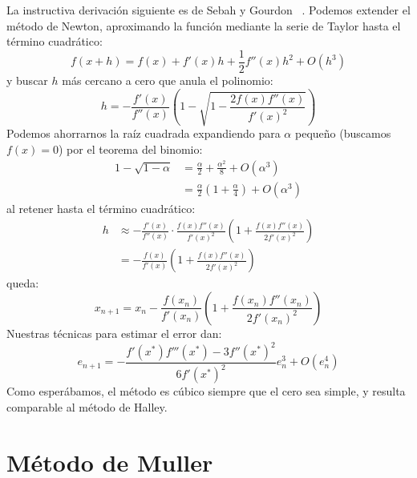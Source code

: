   La instructiva derivación siguiente es de Sebah y Gourdon~%
    \cite{sebah01:_newton_method_higher_order_iterations}.
  Podemos extender el método de Newton,
  aproximando la función
  mediante la serie de Taylor hasta el término cuadrático:
  \begin{equation*}
    f(x + h)
      = f(x) + f'(x) h + \frac{1}{2} f''(x) h^2 + O(h^3)
  \end{equation*}
  y buscar \(h\) más cercano a cero que anula el polinomio:
  \begin{equation*}
    h
      = - \frac{f'(x)}{f''(x)}
            \left(
              1 - \sqrt{1 - \frac{2 f(x) f''(x)}{f'(x)^2}}
            \right)
  \end{equation*}
  Podemos ahorrarnos la raíz cuadrada
  expandiendo para \(\alpha\) pequeño
  (buscamos \(f(x) = 0\))
  por el teorema del binomio:
  \begin{align*}
    1 - \sqrt{1 - \alpha}
      &= \frac{\alpha}{2} + \frac{\alpha^2}{8} + O(\alpha^3) \\
      &= \frac{\alpha}{2}
           \left(
             1 + \frac{\alpha}{4}
           \right)
           + O(\alpha^3)
  \end{align*}
  al retener hasta el término cuadrático:
  \begin{align*}
    h
      &\approx - \frac{f'(x)}{f''(x)}
                   \cdot \frac{f(x) f''(x)}{f'(x)^2}
                           \left(
                             1 + \frac{f(x) f''(x)}{2 f'(x)^2}
                           \right) \\
      &=       - \frac{f(x)}{f'(x)}
                   \left(
                     1 + \frac{f(x) f''(x)}{2 f'(x)^2}
                   \right)
  \end{align*}
  queda:
  \begin{equation}
    \label{eq:cubic-iteration}
    x_{n + 1}
      = x_n
          - \frac{f(x_n)}{f'(x_n)}
              \left(
                1 + \frac{f(x_n) f''(x_n)}{2 f'(x_n)^2}
              \right)
  \end{equation}
  Nuestras técnicas para estimar el error dan:
  \begin{equation}
    \label{eq:cubic-iteration-error}
    e_{n + 1}
      = - \frac{f'(x^*) f'''(x^*) - 3 f''(x^*)^2}{6 f'(x^*)^2} e_n^3
            + O(e_n^4)
  \end{equation}
  Como esperábamos,
  el método es cúbico siempre que el cero sea simple,
  y resulta comparable al método de Halley.

\section{Método de Muller}
\label{sec:metodo-de-muller}

